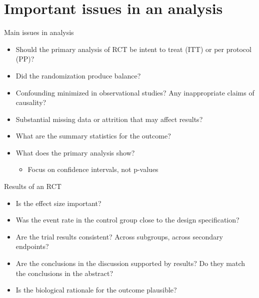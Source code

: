 \documentclass[ignorenonframetext,]{beamer}
\begin{document}
\section{Important issues in an
analysis}\label{important-issues-in-an-analysis}

\begin{frame}{Main issues in analysis}

\begin{itemize}
\item
  Should the primary analysis of RCT be intent to treat (ITT) or per
  protocol (PP)?
\item
  Did the randomization produce balance?
\item
  Confounding minimized in observational studies? Any inappropriate
  claims of causality?
\item
  Substantial missing data or attrition that may affect results?
\item
  What are the summary statistics for the outcome?
\item
  What does the primary analysis show?

  \begin{itemize}
  \itemsep1pt\parskip0pt
  \item
    \normalsize{Focus on confidence intervals, not p-values}
  \end{itemize}
\end{itemize}

\end{frame}

\begin{frame}{Results of an RCT}

\begin{itemize}
\item
  Is the effect size important?
\item
  Was the event rate in the control group close to the design
  specification?
\item
  Are the trial results consistent? Across subgroups, across secondary
  endpoints?
\item
  Are the conclusions in the discussion supported by results? Do they
  match the conclusions in the abstract?
\item
  Is the biological rationale for the outcome plausible?
\end{itemize}

\end{frame}
\end{document}
